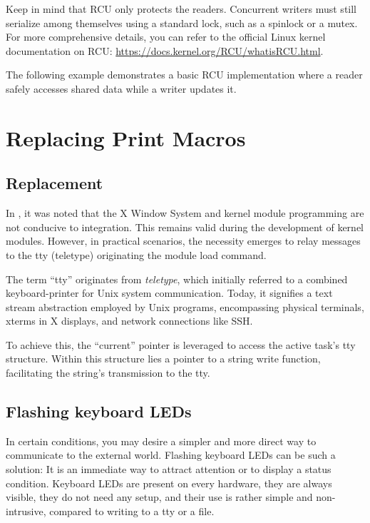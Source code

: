 \documentclass[10pt, oneside]{book}
\begin{document}
Keep in mind that RCU only protects the readers.
Concurrent writers must still serialize among themselves using a standard lock, such as a spinlock or a mutex.
For more comprehensive details, you can refer to the official Linux kernel documentation on RCU: \url{https://docs.kernel.org/RCU/whatisRCU.html}.

The following example demonstrates a basic RCU implementation where a reader safely accesses shared data while a writer updates it.


\section{Replacing Print Macros}
\label{sec:print_macros}
\subsection{Replacement}
In , it was noted that the X Window System and kernel module programming are not conducive to integration.
This remains valid during the development of kernel modules.
However, in practical scenarios, the necessity emerges to relay messages to the tty (teletype) originating the module load command.

The term ``tty'' originates from \emph{teletype}, which initially referred to a combined keyboard-printer for Unix system communication.
Today, it signifies a text stream abstraction employed by Unix programs, encompassing physical terminals,
xterms in X displays, and network connections like SSH.

To achieve this, the ``current'' pointer is leveraged to access the active task's tty structure.
Within this structure lies a pointer to a string write function, facilitating the string's transmission to the tty.


\subsection{Flashing keyboard LEDs}
\label{sec:flash_kb_led}
In certain conditions, you may desire a simpler and more direct way to communicate to the external world.
Flashing keyboard LEDs can be such a solution: It is an immediate way to attract attention or to display a status condition.
Keyboard LEDs are present on every hardware, they are always visible, they do not need any setup, and their use is rather simple and non-intrusive, compared to writing to a tty or a file.
\end{document}
